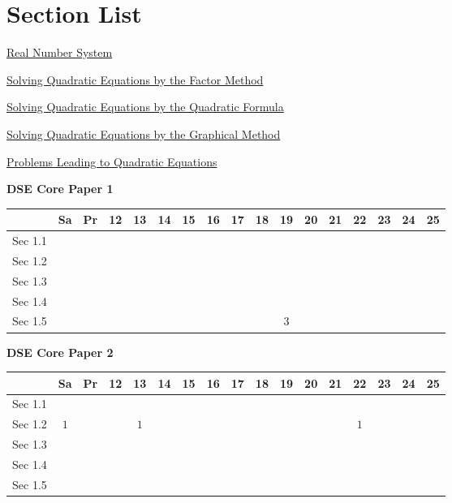 \documentclass[12pt, a4paper]{article}
\begin{document}
\section*{Section List}
\begin{enumx}[label=Sec 1.\arabic*\ ]
\item \hyperref[section:4-1-1]{Real Number System}
\item \hyperref[section:4-1-2]{Solving Quadratic Equations by the Factor Method}
\item \hyperref[section:4-1-3]{Solving Quadratic Equations by the Quadratic Formula}
\item \hyperref[section:4-1-4]{Solving Quadratic Equations by the Graphical Method}
\item \hyperref[section:4-1-5]{Problems Leading to Quadratic Equations}
\end{enumx}
\begin{absolutelynopagebreak}
\begin{center}
\textbf{DSE Core Paper 1}
\end{center}
\begin{center}
\begin{tabular}{|l|c|c|c|c|c|c|c|c|c|c|c|c|c|c|c|c|}
\hline
        & Sa & Pr & 12 & 13 & 14 & 15 & 16 & 17 & 18 & 19 & 20 & 21 & 22 & 23 & 24 & 25 \\\hline\hline
Sec 1.1 &  &  &  &  &  &  &  &  &  &  &  &  &  &  &  &  \\\hline
Sec 1.2 &  &  &  &  &  &  &  &  &  &  &  &  &  &  &  &  \\\hline
Sec 1.3 &  &  &  &  &  &  &  &  &  &  &  &  &  &  &  &  \\\hline
Sec 1.4 &  &  &  &  &  &  &  &  &  &  &  &  &  &  &  &  \\\hline
Sec 1.5 &  &  &  &  &  &  &  &  &  &  $3$ &  &  &  &  &  &  \\\hline
\end{tabular}
\end{center}
\end{absolutelynopagebreak}
\begin{absolutelynopagebreak}
\begin{center}
\textbf{DSE Core Paper 2}
\end{center}
\begin{center}
\begin{tabular}{|l|c|c|c|c|c|c|c|c|c|c|c|c|c|c|c|c|}
\hline
        & Sa & Pr & 12 & 13 & 14 & 15 & 16 & 17 & 18 & 19 & 20 & 21 & 22 & 23 & 24 & 25 \\\hline\hline
Sec 1.1 &  &  &  &  &  &  &  &  &  &  &  &  &  &  &  &  \\\hline
Sec 1.2 &  $1$ &  &  &  $1$ &  &  &  &  &  &  &  &  &  $1$ &  &  &  \\\hline
Sec 1.3 &  &  &  &  &  &  &  &  &  &  &  &  &  &  &  &  \\\hline
Sec 1.4 &  &  &  &  &  &  &  &  &  &  &  &  &  &  &  &  \\\hline
Sec 1.5 &  &  &  &  &  &  &  &  &  &  &  &  &  &  &  &  \\\hline
\end{tabular}
\end{center}
\end{absolutelynopagebreak}
\end{document}
